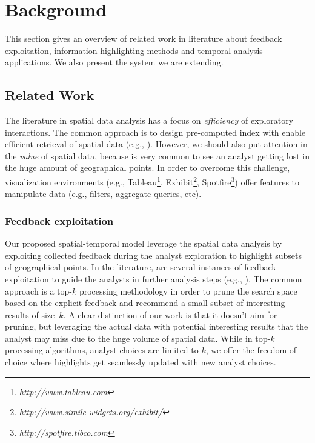 \chapter{Background}
\label{chap:background}

This section gives an overview of related work in literature about feedback exploitation, information-highlighting methods and temporal analysis applications. We also present the system we are extending.

\section{Related Work}

The literature in spatial data analysis has a focus on {\em efficiency} of exploratory interactions. The common approach is to design pre-computed index with enable efficient retrieval of spatial data (e.g., \cite{lins2013nanocubes}). However,
we should also put attention in the {\em value} of spatial data, because is very common to see an analyst getting lost in the huge amount of geographical points. In order to overcome this challenge, visualization environments (e.g., Tableau\footnote{\it http://www.tableau.com}, Exhibit\footnote{\it http://www.simile-widgets.org/exhibit/}, Spotfire\footnote{\it  http://spotfire.tibco.com}) offer features to manipulate data (e.g., filters, aggregate queries, etc).

\subsection{Feedback exploitation}

Our proposed spatial-temporal model leverage the spatial data analysis by exploiting collected feedback during the analyst exploration to highlight subsets of geographical points. In the literature, are several instances of feedback exploitation to guide the analysts in further analysis steps (e.g., ).  The common approach is a top-$k$ processing methodology in order to prune the search space based on the explicit feedback and recommend a small subset of interesting results of size~$k$. A clear distinction of our work is that it doesn't aim for pruning, but leveraging the actual data with potential interesting results that the analyst may miss due to the huge volume of spatial data. While in top-$k$ processing algorithms, analyst choices are limited to $k$, we offer the freedom of choice where highlights get seamlessly updated with new analyst choices.


